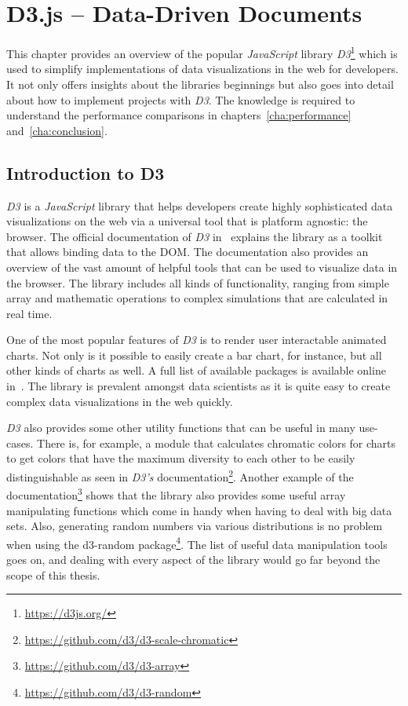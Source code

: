 \chapter{D3.js – Data-Driven Documents}
\label{cha:d3js}

This chapter provides an overview of the popular \emph{JavaScript} library \emph{D3}\footnote{\url{https://d3js.org/}} which is used to simplify implementations of data visualizations in the web for developers. It not only offers insights about the libraries beginnings but also goes into detail about how to implement projects with \emph{D3}. The knowledge is required to understand the performance comparisons in chapters~\ref{cha:performance} and~\ref{cha:conclusion}.


\section{Introduction to D3}

\emph{D3} is a \emph{JavaScript} library that helps developers create highly sophisticated data visualizations on the web via a universal tool that is platform agnostic: the browser. The official documentation of \emph{D3} in~\cite{D3Website} explains the library as a toolkit that allows binding data to the DOM. The documentation also provides an overview of the vast amount of helpful tools that can be used to visualize data in the browser. The library includes all kinds of functionality, ranging from simple array and mathematic operations to complex simulations that are calculated in real time.

One of the most popular features of \emph{D3} is to render user interactable animated charts. Not only is it possible to easily create a bar chart, for instance, but all other kinds of charts as well. A full list of available packages is available online in~\cite{D3Github}. The library is prevalent amongst data scientists as it is quite easy to create complex data visualizations in the web quickly.

\emph{D3} also provides some other utility functions that can be useful in many use-cases. There is, for example, a module that calculates chromatic colors for charts to get colors that have the maximum diversity to each other to be easily distinguishable as seen in \emph{D3's} documentation\footnote{\url{https://github.com/d3/d3-scale-chromatic}}. Another example of the documentation\footnote{\url{https://github.com/d3/d3-array}} shows that the library also provides some useful array manipulating functions which come in handy when having to deal with big data sets. Also, generating random numbers via various distributions is no problem when using the d3-random package\footnote{\url{https://github.com/d3/d3-random}}. The list of useful data manipulation tools goes on, and dealing with every aspect of the library would go far beyond the scope of this thesis. 

